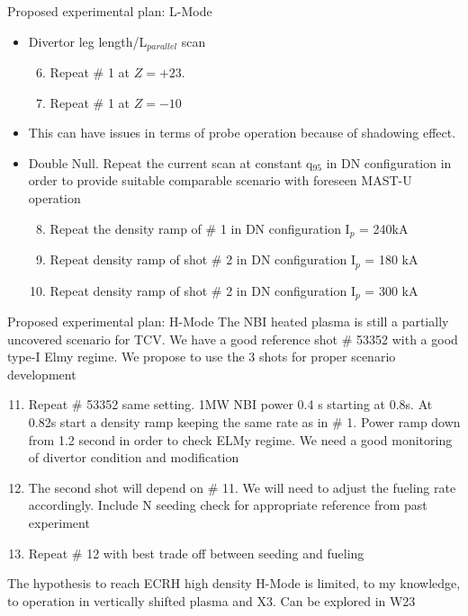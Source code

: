 \documentclass[10pt, compress]{beamer}
\begin{document}
  \begin{frame}{Proposed experimental plan: L-Mode}
    \begin{itemize}
      \item Divertor leg length/L$_{parallel}$ scan
      \begin{enumerate}
        \setcounter{enumi}{5}
      \item Repeat \# 1 at $Z=+23$.
      \item Repeat \# 1 at $Z=-10$  
      \end{enumerate}
      \item This can have issues in terms of probe operation because
        of shadowing effect. 
      \item Double Null. Repeat the current scan at constant q$_{95}$ in
        DN configuration in order to provide suitable comparable
        scenario with foreseen MAST-U operation
        \begin{enumerate}
          \setcounter{enumi}{7}
          \item Repeat the density ramp of \# 1 in DN configuration
            I$_p$ = 240kA
          \item Repeat density ramp of shot \# 2 in DN configuration
            I$_p$ = 180 kA
          \item Repeat density ramp of shot \# 2 in DN configuration
            I$_p$ = 300 kA
          \end{enumerate}
        \end{itemize}
      \end{frame}

      \begin{frame}{Proposed experimental plan: H-Mode}
        The NBI heated plasma is still a partially uncovered scenario
        for TCV. We have a good reference shot \# 53352 with a good
        type-I Elmy regime. We propose to use the 3 shots for proper
        scenario development
        \begin{enumerate}
          \setcounter{enumi}{10}
          \item Repeat \# 53352 same setting. 1MW NBI power 0.4
            s starting at 0.8s. At 0.82s start a density ramp keeping
            the same rate as in \# 1. Power ramp down from 1.2 second
            in order to check ELMy regime. \alert{We need a good
              monitoring of divertor condition and modification}
          \item The second shot will depend on \# 11. We will need to
            adjust the fueling rate accordingly. Include N seeding
            \alert{check for appropriate reference from past
              experiment}
          \item Repeat \# 12 with best trade off between seeding and fueling
          \end{enumerate}
          The hypothesis to reach ECRH high density H-Mode is limited, to my
          knowledge, to operation in vertically shifted plasma and
          X3. Can be explored in W23
        \end{frame}
\end{document}
